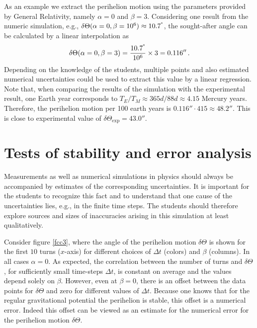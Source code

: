 \documentclass[12pt,ngerman,american]{iopart}
\begin{document}
As an example we  extract the perihelion motion using the parameters provided by General Relativity, namely $\alpha = 0$ and $\beta = 3$.
Considering one result from the numeric simulation, e.g., $\delta\Theta(\alpha = 0, \beta=10^6) \approx 10.7^{\degree}$, the sought-after angle can be calculated by a linear interpolation as
\begin{equation}
	\delta\Theta (\alpha=0, \beta=3) = \frac{10.7^{\degree}}{10^6} \times 3 = 0.116''
	\, .
\end{equation}
Depending on the knowledge of the students, multiple points and also estimated numerical uncertainties could be used to extract this value by a linear regression.
Note that, when comparing the results of the simulation with the experimental result, one Earth year corresponds to $T_E/T_M \approx 365d/88d\approx 4.15$ Mercury years.
Therefore, the perihelion motion per 100 earth years is $0.116''\cdot 415\approx 48.2''$.
This is close to experimental value of $\delta\Theta_{\mathrm{exp}} = 43.0''$.

\section{Tests of stability and error analysis}\label{sec:stability}
Measurements as well as numerical simulations in physics should always be accompanied by estimates of the corresponding uncertainties.
It is important for the students to recognize this fact and to understand that one cause of the uncertainties lies, e.g., in the finite time steps.
The students should therefore explore sources and sizes of inaccuracies arising in this simulation at least qualitatively.

Consider figure \ref{fcc3}, where the angle of the perihelion motion $\delta \Theta$ is shown for the first $10$ turns ($x$-axis) for different choices of $\Delta t$ (colors) and $\beta$ (columns). In all cases $\alpha=0$.
As expected, the correlation between the number of turns and $\delta\Theta$, for sufficiently small time-steps $\Delta t$, is constant on average and the values
depend solely on $\beta$.
However, even at $\beta=0$, there is an offset between the data points for $\delta \Theta$ and zero for different values of $\Delta t$.
Because one knows that for the regular gravitational potential the perihelion is stable, this offset is a numerical error.
Indeed this offset can be viewed as an estimate for the numerical error for the perihelion motion $\delta \Theta$.
\end{document}
